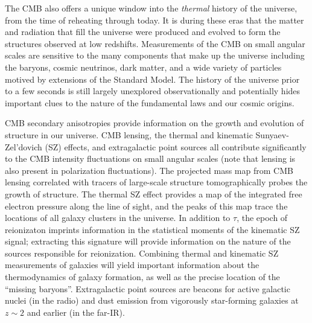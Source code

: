 \documentclass[PICOReport.tex]{subfiles}
\begin{document}
The CMB also offers a unique window into the {\it thermal} history of the universe, from the time of reheating through today.  It is during these eras that the matter and radiation that fill the universe were produced and evolved to form the structures observed at low redshifts.  Measurements of the CMB on small angular scales are sensitive to the many components that make up the universe including the baryons, cosmic neutrinos, dark matter, and a wide variety of particles motived by extensions of the Standard Model.  The history of the universe prior to a few seconds is still largely unexplored observationally and potentially hides important clues to the nature of the fundamental laws and our cosmic origins.

CMB secondary anisotropies provide information on the growth and evolution of structure in our universe. CMB lensing, the thermal and kinematic Sunyaev-Zel'dovich (SZ) effects, and extragalactic point sources all contribute significantly to the CMB intensity fluctuations on small angular scales (note that lensing is also present in polarization fluctuations). The projected mass map from CMB lensing correlated with tracers of large-scale structure tomographically probes the growth of structure. The thermal SZ effect provides a map of the integrated free electron pressure along the line of sight, and the peaks of this map trace the locations of all galaxy clusters in the universe. In addition to $\tau$, the epoch of reionizaton imprints information in the statistical moments of the kinematic SZ signal; extracting this signature will provide information on the nature of the sources responsible for reionization.  Combining thermal and kinematic SZ measurements of galaxies will yield important information about the thermodynamics of galaxy formation, as well as the precise location of the ``missing baryons''. Extragalactic point sources are beacons for active galactic nuclei (in the radio) and dust emission from vigorously star-forming galaxies at $z \sim 2$ and earlier (in the far-IR).
\end{document}

